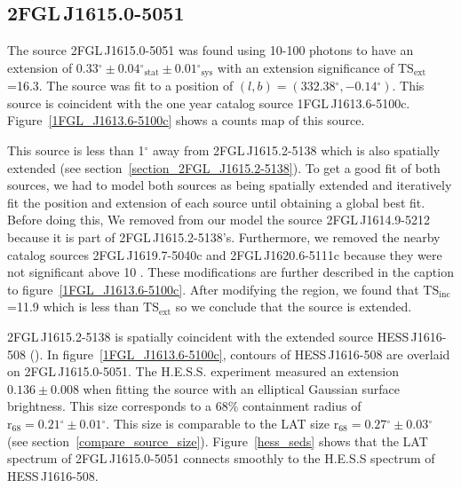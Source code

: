 \documentclass[12pt,preprint]{aastex}
\newcommand{\gev}{\text{GeV}\xspace}
\newcommand{\tev}{\text{TeV}\xspace}
\newcommand{\tsext}{{\ensuremath{\text{TS}_{\text{ext}}}}\xspace}
\newcommand{\tsinc}{\ensuremath{\text{TS}_{\text{inc}}}\xspace}
\newcommand{\rsixeight}{{\ensuremath{\text{r}_{68}}}\xspace}
\newcommand{\sys}{\text{sys}\xspace}
\newcommand{\stat}{\text{stat}\xspace}
\renewcommand{\deg}{\ensuremath{^\circ}\xspace}
\begin{document}
\subsection{2FGL\,J1615.0-5051}
\label{section_2FGL_J1615.0-5051}


The source 2FGL\,J1615.0-5051 was found using 10-100 \tev
photons to have an extension of $0.33\deg\pm0.04\deg_\stat\pm0.01\deg_\sys$
with an extension significance of \tsext=16.3.  The source
was fit to a position of $(l,b)=(332.38\deg,-0.14\deg)$.
This source is coincident with the one year catalog source
1FGL\,J1613.6-5100c. Figure~\ref{1FGL_J1613.6-5100c} shows a counts map
of this source.

This source is less than 1\deg away from 2FGL\,J1615.2-5138 which is
also spatially extended (see section~\ref{section_2FGL_J1615.2-5138}).
To get a good fit of both sources, we had to model both sources as
being spatially extended and iteratively fit the position and extension
of each source until obtaining a global best fit.  Before doing this,
We removed from our model the source 2FGL\,J1614.9-5212 because it is
part of 2FGL\,J1615.2-5138's. Furthermore, we removed the nearby catalog
sources 2FGL\,J1619.7-5040c and 2FGL\,J1620.6-5111c because they were not
significant above 10 \gev.  These modifications are further described
in the caption to figure~\ref{1FGL_J1613.6-5100c}.  After modifying
the region, we found that \tsinc=11.9 which is less than \tsext so we
conclude that the source is extended.

2FGL\,J1615.2-5138 is spatially coincident with the extended
\tev source HESS\,J1616-508 (\cite{hess_plane_survey}).  In
figure~\ref{1FGL_J1613.6-5100c}, contours of HESS\,J1616-508 are overlaid
on 2FGL\,J1615.0-5051.  The H.E.S.S. experiment measured an
extension $0.136\pm 0.008$ when fitting the source with an elliptical
Gaussian surface brightness.  This size corresponds to a 68\% containment
radius of $\rsixeight=0.21\deg\pm0.01\deg$. This size is comparable to the LAT
size $\rsixeight=0.27\deg\pm0.03\deg$ (see section~\ref{compare_source_size}).
Figure~\ref{hess_seds} shows that the LAT spectrum of 2FGL\,J1615.0-5051
connects smoothly to the H.E.S.S spectrum of HESS\,J1616-508.
\end{document}
